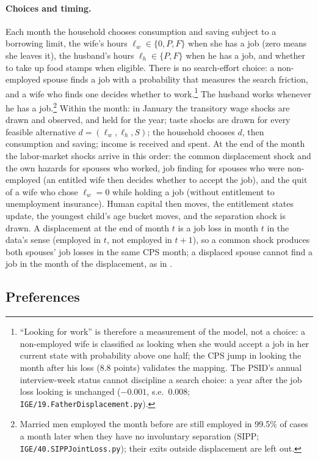 \paragraph{Choices and timing.} Each month the household chooses consumption and saving subject to a borrowing limit,
the wife's hours $\ell_w \in \{0, P, F\}$ when she has a job (zero means she leaves it), the husband's hours
$\ell_h \in \{P, F\}$ when he has a job, and whether to take up food stamps when eligible. There is no search-effort
choice: a non-employed spouse finds a job with a probability that measures the search friction, and a wife who finds
one decides whether to work.\footnote{``Looking for work'' is therefore a measurement of the model, not a choice: a
non-employed wife is classified as looking when she would accept a job in her current state with probability above one
half; the CPS jump in looking the month after his loss (8.8 points) validates the mapping. The PSID's annual
interview-week status cannot discipline a search choice: a year after the job loss looking is unchanged ($-0.001$,
s.e.\ 0.008; \texttt{IGE/19.FatherDisplacement.py}).} The husband works whenever he has a job.\footnote{Married men
employed the month before are still employed in 99.5\% of cases a month later when they have no involuntary separation
(SIPP; \texttt{IGE/40.SIPPJointLoss.py}); their exits outside displacement are left out.} Within the month: in January
the transitory wage shocks are drawn and observed, and held for the year; taste shocks are drawn for every feasible
alternative $d = (\ell_w, \ell_h, S)$; the household chooses $d$, then consumption and saving; income is received and
spent. At the end of the month the labor-market shocks arrive in this order: the common displacement shock and the own
hazards for spouses who worked, job finding for spouses who were non-employed (an entitled wife then decides whether to
accept the job), and the quit of a wife who chose
$\ell_w = 0$ while holding a job (without entitlement to unemployment insurance). Human capital then moves, the
entitlement states update, the youngest child's age bucket moves, and the separation shock is drawn. A displacement at
the end of month $t$ is a job loss in month $t$ in the data's sense (employed in $t$, not employed in $t+1$), so a
common shock produces both spouses' job losses in the same CPS month; a displaced spouse cannot find a job in the
month of the displacement, as in \citet{bacher2025joint}.

\subsection{Preferences}

